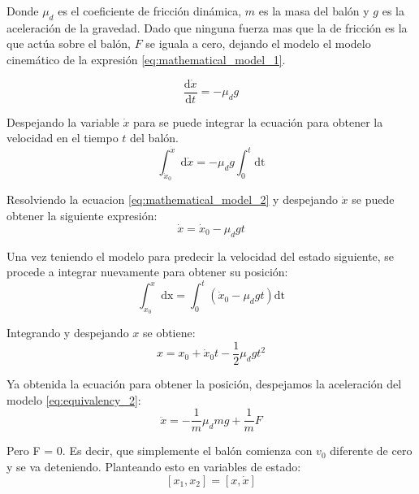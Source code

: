 Donde $\mu_d$ es el coeficiente de fricción dinámica, $m$ es la masa del balón y $g$ es la aceleración de la gravedad. Dado que ninguna fuerza mas que la de fricción es la que actúa sobre el balón, $F$ se iguala a cero, dejando el modelo el modelo cinemático de la expresión \ref{eq:mathematical_model_1}.

\begin{equation}
\frac{\mathrm{d} \dot{x}}{\mathrm{d} t} = - \mu_d g
\label{eq:mathematical_model_1}
\end{equation}

Despejando la variable $\dot{x}$ para se puede integrar la ecuación para obtener la velocidad en el tiempo $t$ del balón.
\begin{equation}
\int_{\dot{x}_0}^{\dot{x}} \mathrm{d} \dot{x} = -\mu_d g \int_{0}^{t} \mathrm{dt}  
\label{eq:mathematical_model_2}
\end{equation}

Resolviendo la ecuacion \ref{eq:mathematical_model_2} y despejando $\dot{x}$ se puede obtener la siguiente expresión:
\begin{equation}
\dot{x} = \dot{x}_{0} - \mu_d g t 
\label{eq:velocity_prediction}
\end{equation}

Una vez teniendo el modelo para predecir la velocidad del estado siguiente, se procede a integrar nuevamente para obtener su posición:
\begin{equation}
\int_{x_{0}}^{x} \mathrm{dx} = \int_{0}^{t} (\dot{x}_{0} - \mu_d g t) \mathrm{dt}
\label{eq:mathematical_model_4}
\end{equation}

Integrando y despejando $x$ se obtiene:
\begin{equation}
x = x_0 + \dot{x}_0 t - \frac{1}{2} \mu_d g t^2
\label{eq:position_prediction}
\end{equation}

Ya obtenida la ecuación para obtener la posición, despejamos la aceleración del modelo \ref{eq:equivalency_2}:
\begin{equation}
\ddot{x} = -\frac{1}{m}\mu_d m g + \frac{1}{m}F
\end{equation}

Pero F = 0. Es decir, que simplemente el balón comienza con $v_{0}$ diferente de cero y se va deteniendo.
Planteando esto en variables de estado:
\[ [x_1,x_2] = [x, \dot{x}]\]

